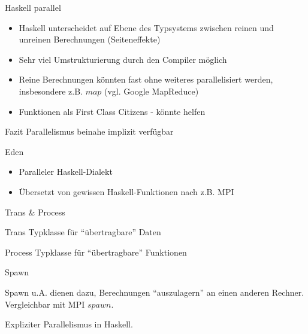 \documentclass{beamer}
\begin{document}
\begin{frame}{Haskell parallel}
\begin{itemize}
\item Haskell unterscheidet auf Ebene des Typsystems zwischen
  reinen und unreinen Berechnungen (Seiteneffekte)
\item Sehr viel Umstrukturierung durch den Compiler möglich
\item Reine Berechnungen könnten fast ohne weiteres parallelisiert
  werden, insbesondere z.B. $map$
(vgl. Google\textsuperscript{\texttrademark}
  MapReduce\textsuperscript{\texttrademark})
\item Funktionen als First Class Citizens - könnte helfen
\end{itemize}
\begin{definition}{Fazit}
Parallelismus beinahe implizit verfügbar
\end{definition}
\end{frame}

\begin{frame}{Eden}
\begin{itemize}
\item Paralleler Haskell-Dialekt
\item Übersetzt von gewissen Haskell-Funktionen nach z.B. MPI
\end{itemize}
\end{frame}

\begin{frame}{Trans \& Process}

\begin{definition}{Trans}
Typklasse für ``übertragbare'' Daten
\end{definition}

\begin{definition}{Process}
Typklasse für ``übertragbare'' Funktionen
\end{definition}

\end{frame}

\begin{frame}{Spawn}

Spawn u.A. dienen dazu, Berechnungen ``auszulagern'' an einen anderen
Rechner. Vergleichbar mit MPI $spawn$.

Expliziter Parallelismus in Haskell.

\end{frame}
\end{document}
